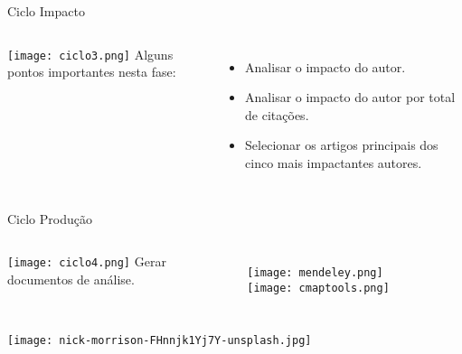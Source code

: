 \begin{frame}[c]{Ciclo Impacto}
    \begin{columns}
            \centering
            \texttt{[image: ciclo3.png]}
            Alguns pontos importantes nesta fase:
            \begin{itemize}
                \item Analisar o impacto do autor.
                \item Analisar o impacto do autor por total de citações.
                \item Selecionar os artigos principais dos cinco mais impactantes autores.
            \end{itemize}
        
    \end{columns}

\end{frame}
\begin{frame}[c]{Ciclo Produção}
    \begin{columns}
            \centering
            \texttt{[image: ciclo4.png]}
            Gerar documentos de análise.

            \centering
            \begin{figure}
                     \texttt{[image: mendeley.png]}
                     \hfill
                     \texttt{[image: cmaptools.png]}
            \end{figure}
        
    \end{columns}

\end{frame}
{
{\texttt{[image: nick-morrison-FHnnjk1Yj7Y-unsplash.jpg]}}
\begin{frame}[t]{} 
\end{frame}
}
